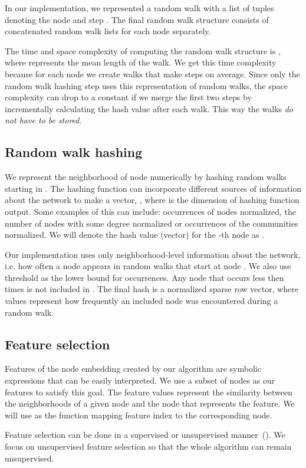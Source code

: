 \documentclass[twoside,11pt]{article}
\begin{document}
In our implementation, we represented a random walk with a list of tuples denoting the node and step . The final random walk structure consists of concatenated random walk lists  for each node separately.

The time and space complexity of computing the random walk structure is , where  represents the mean length of the walk. We get this time complexity because for each node we create  walks that make  steps on average. Since only the random walk hashing step uses this representation of random walks, the space complexity can drop to a constant if we merge the first two steps by incrementally calculating the hash value after each walk. This way the walks \emph{do not have to be stored}.

\subsection{Random walk hashing}
\label{walkhash}
We represent the neighborhood of node  numerically by hashing random walks starting in . The hashing function can incorporate different sources of information about the network to make a vector, , where  is the dimension of hashing function output. Some examples of this can include: occurrences of nodes normalized, the number of nodes with some degree normalized or occurrences of the communities normalized. We will denote the hash value (vector) for the -th node as .

Our implementation uses only neighborhood-level information about the network, i.e. how often a node appears in random walks that start at node . We also use threshold  as the lower bound for occurrences. Any node that occurs less then  times is not included in . The final hash is a normalized sparse row vector, where values represent how frequently an included node was encountered during a random walk.

\subsection{Feature selection}
\label{sec:featselection}
Features of the node embedding created by our algorithm are symbolic expressions that can be easily interpreted. We use a subset of nodes as our features to satisfy this goal. The feature values represent the similarity between the neighborhoods of a given node and the node that represents the feature. We will use  as the function mapping feature index to the corresponding node. 

Feature selection can be done in a supervised or unsupervised manner~(\cite{saeys2007feature}). We focus on unsupervised feature selection so that the whole algorithm can remain unsupervised.
\end{document}

